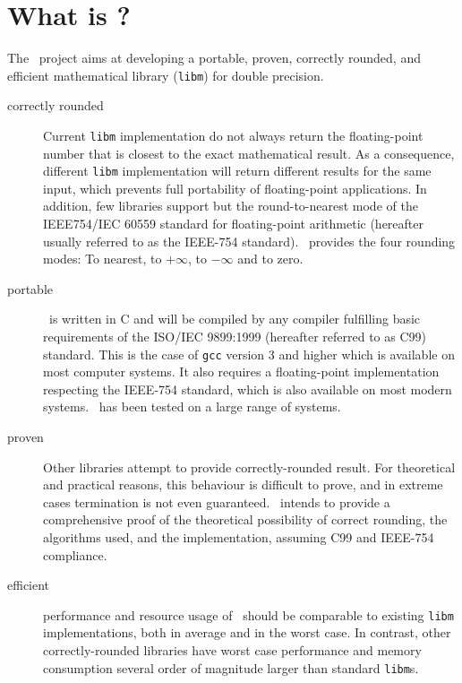 \section{What is \crlibm?}

The \crlibm\ project aims at developing a portable, proven, correctly rounded,
and efficient mathematical library (\texttt{libm}) for double precision. 

\begin{description}
\item[correctly rounded] Current \texttt{libm} implementation do not
  always return the floating-point number that is closest to the exact
  mathematical result. As a consequence, different \texttt{libm}
  implementation will return different results for the same input,
  which prevents full portability of floating-point applications. In
  addition, few libraries support but the round-to-nearest mode of the
  IEEE754/IEC 60559 standard for floating-point arithmetic (hereafter
  usually referred to as the IEEE-754 standard). \crlibm\ provides the
  four rounding modes: To nearest, to $+\infty$, to $-\infty$ and to
  zero.

\item[portable] \crlibm\ is written in C and will be compiled by any
  compiler fulfilling basic requirements of the ISO/IEC 9899:1999
  (hereafter referred to as C99) standard.  This is the case of
  \texttt{gcc} version 3 and higher which is available on most
  computer systems. It also requires a floating-point implementation
  respecting the IEEE-754 standard, which is also available on
  most modern systems. \crlibm\ has been tested on a large range of
  systems.

\item[proven] Other libraries attempt to provide correctly-rounded
  result. For theoretical and practical reasons, this behaviour is
  difficult to prove, and in extreme cases termination is not even
  guaranteed. \crlibm\ intends to provide a comprehensive proof of the
  theoretical possibility of correct rounding, the algorithms used,
  and the implementation, assuming C99 and IEEE-754 compliance.

\item[efficient] performance and resource usage of \crlibm\ should be
  comparable to existing \texttt{libm} implementations, both in
  average and in the worst case. In contrast, other correctly-rounded
  libraries have worst case performance and memory consumption several
  order of magnitude larger than standard \texttt{libm}s.

\end{description}

